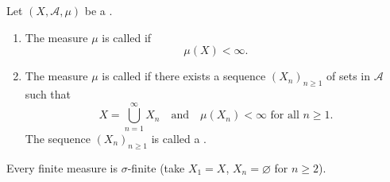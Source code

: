 \begin{definition} \label{definition:finite_sigma_finite_measure_space_for_a_measure_on_a_measurable_space}
Let $(X, \mathcal{A}, \mu)$ be a .

\begin{enumerate}
    \item The measure $\mu$ is called  if
    $$\mu(X) < \infty.$$

    \item The measure $\mu$ is called  if there exists a sequence $(X_n)_{n\ge 1}$ of sets in $\mathcal{A}$ such that
    $$X = \bigcup_{n=1}^\infty X_n \quad \text{and} \quad \mu(X_n) < \infty \text{ for all } n \ge 1.$$
    The sequence $(X_n)_{n\ge 1}$ is called a .
\end{enumerate}

Every finite measure is $\sigma$-finite (take $X_1 = X$, $X_n = \varnothing$ for $n \ge 2$).
\end{definition}
